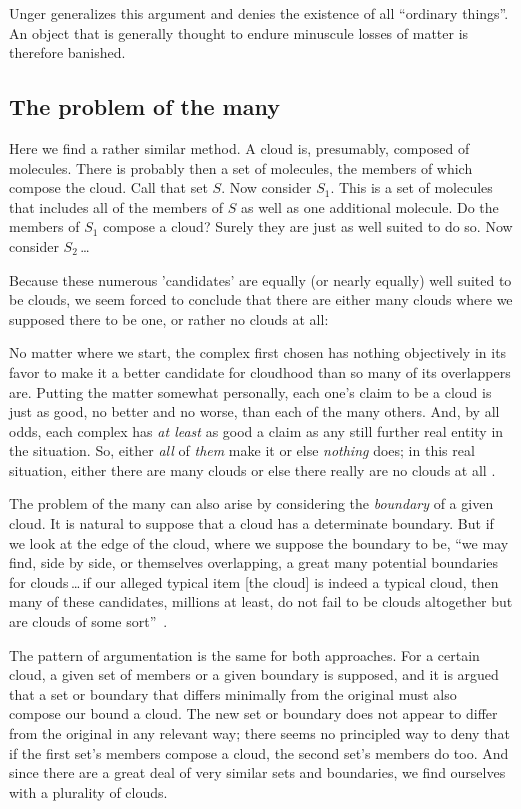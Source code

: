 \documentclass[11pt]{article}
\newenvironment{squote}{%
\begin{spacing}{1}
       	\begin{list}{}{%
\setlength{\labelwidth}{0pt}%
\rightmargin\leftmargin%
}
\item\relax
}{%
\end{list}%
\end{spacing}
}
\begin{document}
\begin{spacing}{1.5}
Unger generalizes this argument and denies the existence of all
``ordinary things''.  An object that is generally thought to endure
minuscule losses of matter is therefore banished.

\subsection{The problem of the many}
Here we find a rather similar method.  A cloud is, presumably,
composed of molecules.  There is probably then a set of molecules, the
members of which compose the cloud.  Call that set $S$.  Now consider
$S_1$.  This is a set of molecules that includes all of the members of
$S$ as well as one additional molecule.  Do the members of $S_1$
compose a cloud?  Surely they are just as well suited to do so.  Now
consider $S_2$\,\ldots

Because these numerous 'candidates' are equally (or nearly equally)
well suited to be clouds, we seem forced to conclude that there are
either many clouds where we supposed there to be one, or rather no
clouds at all:

\begin{squote}
No matter where we start, the complex first chosen has nothing
objectively in its favor to make it a better candidate for cloudhood
than so many of its overlappers are.  Putting the matter somewhat
personally, each one's claim to be a cloud is just as good, no better
and no worse, than each of the many others.  And, by all odds, each
complex has \emph{at least} as good a claim as any still further real
entity in the situation.  So, either \emph{all} of \emph{them} make it
or else \emph{nothing} does; in this real situation, either there are
many clouds or else there really are no clouds at all
\citep[415--??]{unger1980a}.
\end{squote}

The problem of the many can also arise by considering the {\em
  boundary} of a given cloud.  It is natural to suppose that a cloud
has a determinate boundary.  But if we look at the edge of the cloud,
where we suppose the boundary to be, ``we may find, side by side, or
themselves overlapping, a great many potential boundaries for
clouds\,\ldots\,if our alleged typical item {[}the cloud{]} is indeed
a typical cloud, then many of these candidates, millions at least, do
not fail to be clouds altogether but are clouds of some
sort''~\citep[420--421]{unger1980a}.

The pattern of argumentation is the same for both approaches.  For a
certain cloud, a given set of members or a given boundary is supposed,
and it is argued that a set or boundary that differs minimally from
the original must also compose our bound a cloud.  The new set or
boundary does not appear to differ from the original in any relevant
way; there seems no principled way to deny that if the first set's
members compose a cloud, the second set's members do too.  And since
there are a great deal of very similar sets and boundaries, we find
ourselves with a plurality of clouds.


\end{spacing}
\end{document}
